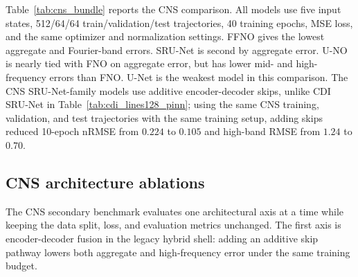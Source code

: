\documentclass[11pt]{article}
\begin{document}
Table~\ref{tab:cns_bundle} reports the CNS comparison. All models use
five input states, 512/64/64 train/validation/test trajectories, 40 training
epochs, MSE loss, and the same optimizer and normalization settings. FFNO gives
the lowest aggregate and Fourier-band errors. SRU-Net is second by aggregate
error. U-NO is nearly tied with FNO on aggregate error, but has lower mid- and
high-frequency errors than FNO. U-Net is the weakest model in this comparison.
The CNS SRU-Net-family models use additive encoder-decoder skips, unlike CDI
SRU-Net in Table~\ref{tab:cdi_lines128_pinn}; using the same CNS training,
validation, and test trajectories with the same training setup, adding skips
reduced 10-epoch nRMSE from $0.224$ to $0.105$ and high-band RMSE from $1.24$
to $0.70$.

\begin{table}[t]
\centering
\scriptsize
\setlength{\tabcolsep}{3pt}
\caption{\textbf{PDEBench CNS results.} All models use five input states,
512/64/64 train/validation/test split, and 40 training
epochs. Low-, mid-, and high-band RMSE are Fourier-band errors. Lower values
are better.}
\label{tab:cns_bundle}

\end{table}

\iffalse

\subsection{CNS architecture ablations}

The CNS secondary benchmark evaluates one architectural axis at a time while
keeping the data split, loss, and evaluation metrics unchanged. The first axis
is encoder-decoder fusion in the legacy hybrid shell: adding an additive skip
pathway lowers both aggregate and high-frequency error under the same training
budget.
\end{document}
